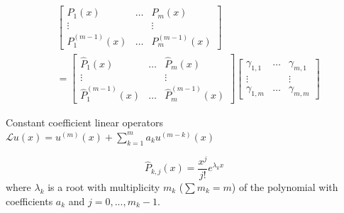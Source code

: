\documentclass{beamer}
\newcommand{\Poly}[1]{\frac{x^#1}{#1!}}
\begin{document}
\begin{frame}
\begin{align*}
& \begin{bmatrix} P_1(x) & \dots & P_m(x) \\ \vdots & & \vdots \\ P_1^{(m-1)}(x) & \dots & P_m^{(m-1)}(x) \end{bmatrix} \\
& = \begin{bmatrix} \hat{P}_1(x) & \dots & \hat{P}_m(x) \\ \vdots & & \vdots \\ \hat{P}_1^{(m-1)}(x) & \dots & \hat{P}_m^{(m-1)}(x) \end{bmatrix} \begin{bmatrix} \gamma_{1,1} & \dots & \gamma_{m,1} \\ \vdots & & \vdots \\ \gamma_{1,m} & \dots & \gamma_{m,m} \end{bmatrix}
\end{align*}
\end{frame}

\begin{frame}
\begin{block}{Constant coefficient linear operators}
$\mathcal{L} u(x) = u^{(m)}(x) + \sum_{k=1}^m a_k u^{(m-k)}(x)$
\end{block}
\begin{equation*}
\hat{P}_{k,j}(x) = \Poly{j} e^{\lambda_k x}
\end{equation*}
where $\lambda_k$ is a root with multiplicity $m_k$ ($\sum m_k = m$) of the polynomial with coefficients $a_k$ and $j = 0,...,m_k-1$.
\end{frame}

\end{document}
